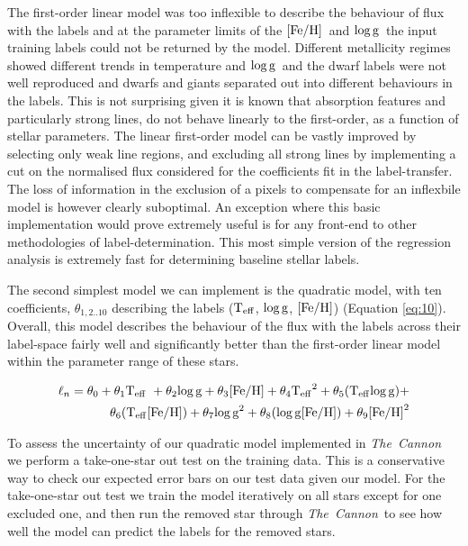 \documentclass[12pt, preprint]{aastex}
\newcommand{\teff}{\mbox{$\rm T_{eff}$}}
\newcommand{\feh}{\mbox{$\rm [Fe/H]$}}
\newcommand{\logg}{\mbox{$\rm \log g$}}
\newcommand{\tc}{\textsl{The~Cannon}}
\begin{document}
The first-order linear model was too inflexible to describe the behaviour of flux with the labels and at the parameter limits of the \feh\ and \logg\ the input training labels could not be returned by the model. 
Different metallicity regimes showed different trends in temperature and \logg\ and the dwarf labels were not well reproduced and dwarfs and giants separated out into different behaviours in the labels. 
This is not surprising given it is known that absorption features and particularly strong lines, do not behave linearly to the first-order, as a function of stellar parameters. 
The linear first-order model can be vastly improved by selecting only weak line regions, and excluding all strong lines by implementing a cut on the normalised flux considered for the coefficients fit in the label-transfer. 
The loss of information in the exclusion of a pixels to compensate for an inflexbile model is however clearly suboptimal. 
An exception where this basic implementation would prove extremely useful is for any front-end to other methodologies of label-determination. 
This most simple version of the regression analysis is extremely fast for determining baseline stellar labels. 

The second simplest model we can implement is the quadratic model, with ten coefficients, $\theta_{1,2..10}$ describing the labels (\teff, \logg, \feh) (Equation \ref{eq:10}).  
Overall, this model describes the behaviour of the flux with the labels across their label-space fairly well and significantly better than the first-order linear model within the parameter range of these stars. 

\begin{equation}
\begin{split}
\ell_n = \theta_0 + \theta_1 \teff\ + \theta_2 \logg + \theta_3 \feh + \theta_4 \teff^2 + \theta_5 (\teff \logg) + \\
\theta_6 (\teff \feh) + \theta_7 \logg^2 + \theta_8 (\logg \feh) + \theta_9 \feh^2
\end{split}
 \label{eq:10}
 \end{equation}

To assess the uncertainty of our quadratic model implemented in \tc\, we perform a take-one-star out test on the training data. 
This is a conservative way to check our expected error bars on our test data given our model. 
For the take-one-star out test we train the model iteratively on all stars except for one excluded one, and then run the removed star through \tc\, to see how well the model can predict the labels for the removed stars. 
\end{document}
